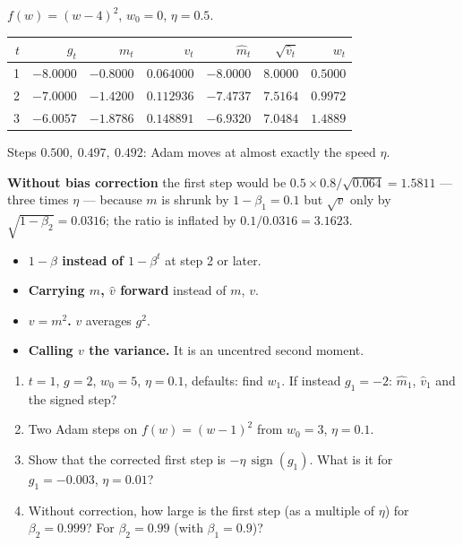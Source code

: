 \documentclass[11pt]{article}
\newcommand{\sgn}{\operatorname{sign}}
\begin{document}
\begin{worked}
$f(w) = (w - 4)^2$, $w_0 = 0$, $\eta = 0.5$.
\begin{center}
\begin{tabular}{@{}rrrrrrr@{}}
\toprule
$t$ & $g_t$ & $m_t$ & $v_t$ & $\hat m_t$ & $\sqrt{\hat v_t}$ & $w_t$\\ \midrule
1 & $-8.0000$ & $-0.8000$ & $0.064000$ & $-8.0000$ & $8.0000$ & $0.5000$\\
2 & $-7.0000$ & $-1.4200$ & $0.112936$ & $-7.4737$ & $7.5164$ & $0.9972$\\
3 & $-6.0057$ & $-1.8786$ & $0.148891$ & $-6.9320$ & $7.0484$ & $1.4889$\\
\bottomrule
\end{tabular}
\end{center}
Steps $0.500,\ 0.497,\ 0.492$: Adam moves at almost exactly the speed $\eta$.

\textbf{Without bias correction} the first step would be
$0.5 \times 0.8/\sqrt{0.064} = 1.5811$ --- three times $\eta$ --- because $m$ is
shrunk by $1 - \beta_1 = 0.1$ but $\sqrt v$ only by $\sqrt{1-\beta_2} =
0.0316$; the ratio is inflated by $0.1/0.0316 = 3.1623$.
\end{worked}

\begin{caution}
\begin{itemize}
  \item \textbf{$1 - \beta$ instead of $1 - \beta^t$} at step 2 or later.
  \item \textbf{Carrying $\hat m$, $\hat v$ forward} instead of $m$, $v$.
  \item \textbf{$v = m^2$.} $v$ averages $g^2$.
  \item \textbf{Calling $v$ the variance.} It is an uncentred second moment.
\end{itemize}
\end{caution}

\begin{tryit}
\begin{enumerate}[label=\textbf{E7.\arabic*}]
  \item $t = 1$, $g = 2$, $w_0 = 5$, $\eta = 0.1$, defaults: find $w_1$. If
    instead $g_1 = -2$: $\hat m_1$, $\hat v_1$ and the signed step?
  \item Two Adam steps on $f(w) = (w - 1)^2$ from $w_0 = 3$, $\eta = 0.1$.
  \item Show that the corrected first step is $-\eta\,\sgn(g_1)$. What is it
    for $g_1 = -0.003$, $\eta = 0.01$?
  \item Without correction, how large is the first step (as a multiple of
    $\eta$) for $\beta_2 = 0.999$? For $\beta_2 = 0.99$ (with $\beta_1 = 0.9$)?
\end{enumerate}
\end{tryit}
\end{document}

